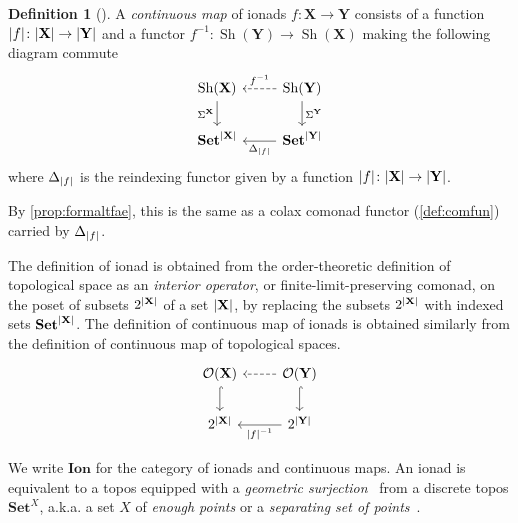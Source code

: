 \documentclass[11pt, oneside, article]{memoir}
\theoremstyle{plain}
\theoremstyle{definition}
\newtheorem{definition}[def]{Definition}
\theoremstyle{remark}
\newenvironment{remark}
{\renewcommand\qedsymbol{$\lrcorner$}%
  \pushQED{\qed}\myremark}
{\popQED\endmyremark}
\DeclareMathOperator{\Sh}{Sh}
\DeclarePairedDelimiter{\abs}{\lvert}{\rvert}
\newcommand{\namedcat}[1]{\mathbf{#1}}
\newcommand{\spa}[1]{\mathbf{#1}}
\newcommand{\ion}[1]{\spa{#1}}
\newcommand{\Set}{\namedcat{Set}}
\newcommand{\pts}[1]{{\abs{#1}}}
\newcommand{\one}[1]{\pts{#1}}
\newcommand{\carr}{\Sigma}
\newcommand{\reindex}[1]{\Delta_{#1}}
\newcommand{\car}[1]{\carr^{#1}}
\newcommand{\conion}[1]{{#1}^{-1}}
\newcommand{\carion}[1]{\car{#1}}
\newcommand{\IonadO}{\namedcat{Ion}}
\newcommand{\tX}{\spa{X}}
\newcommand{\tY}{\spa{Y}}
\newcommand{\iX}{\ion{X}}
\newcommand{\iY}{\ion{Y}}
\newcommand{\SetpX}{\Set^\pts{\iX}}
\newcommand{\SetpY}{\Set^\pts{\iY}}
\newcommand{\opens}[1]{\mathcal{O}(#1)}
\newcommand{\ionopens}[1]{\Sh(#1)}
\begin{document}
\begin{definition}[{\cite[Definition 4.1]{garner:ionads}}]\label{def:ionadmap}
  A \emph{continuous map} of ionads $f \colon \iX \to \iY$ consists of
  a function $\one{f} \colon \pts{\iX} \to \pts{\iY}$ and a functor
  $\conion{f} \colon \ionopens{\iY} \to \ionopens{\iX}$ making the
  following diagram commute
  \[
    \begin{tikzcd}
      \ionopens{\iX} & \ionopens{\iY} \\
      {\SetpX} & {\SetpY}
      \arrow["\carion{\iX}"', from=1-1, to=2-1]
      \arrow["{\conion{f}}"', dashed, from=1-2, to=1-1]
      \arrow["\carion{\iY}", from=1-2, to=2-2]
      \arrow["{\reindex{\one{f}}}", from=2-2, to=2-1]
    \end{tikzcd}
  \]
  where $\reindex{\one{f}}$ is the reindexing functor given by a
  function $\one{f} \colon \pts{\iX} \to \pts{\iY}$.

  By \cref{prop:formaltfae}, this is the same as a colax comonad
  functor (\cref{def:comfun}) carried by $\reindex{\one{f}}$.
\end{definition}

\begin{remark}
  The definition of ionad is obtained from the order-theoretic
  definition of topological space as an \emph{interior operator}, or
  finite-limit-preserving comonad, on the poset of subsets
  $2^{\pts{\tX}}$ of a set $\pts{\tX}$, by replacing the subsets
  $2^{\pts{\tX}}$ with indexed sets $\SetpX$. The definition of
  continuous map of ionads is obtained similarly from the definition
  of continuous map of topological spaces.
  \[
    \begin{tikzcd}
      \opens{\tX} & \opens{\tY} \\
      {2^{\pts{\tX}}} & {2^{\pts{\tY}}}
      \arrow[hook, from=1-1, to=2-1]
      \arrow[dashed, from=1-2, to=1-1]
      \arrow[hook, from=1-2, to=2-2]
      \arrow["{\one{f}^{-1}}", from=2-2, to=2-1]
    \end{tikzcd}
  \]
\end{remark}

We write $\IonadO$ for the category of ionads and continuous maps.  An
ionad is equivalent to a topos equipped with a \emph{geometric
  surjection}~\cite[A4.2]{johnstone:elephant} from a discrete topos
$\Set^X$, a.k.a. a set $X$ of \emph{enough points} or a
\emph{separating set of points}~\cite[C2.2.12]{johnstone:elephant}.
\end{document}
